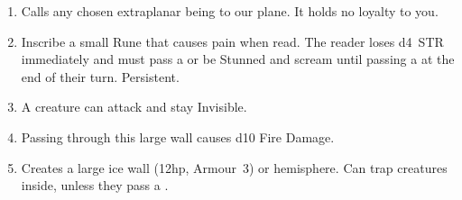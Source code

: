 \documentclass[itdr/core]{subfiles}
\begin{document}
\begin{enumerate}
	\item {} Calls any chosen extraplanar being to our plane. It holds no loyalty to you.
	\item {} Inscribe a small Rune that causes pain when read. The reader loses d4~STR immediately and must pass a  or be Stunned and scream until passing a  at the end of their turn. Persistent.
	\item {} A creature can attack and stay Invisible.
	\item {} Passing through this large wall causes d10 Fire Damage.
	\item {} Creates a large ice wall (12hp, Armour~3) or hemisphere. Can trap creatures inside, unless they pass a .
\end{enumerate}

\vfill
\break
\end{document}
